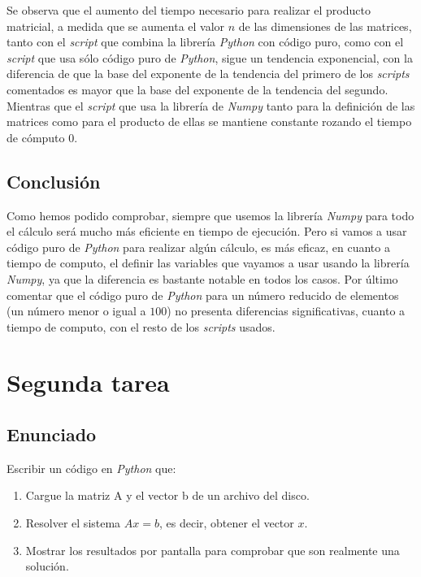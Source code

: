 \documentclass[12pt,twoside]{article}
\begin{document}
Se observa que el aumento del tiempo necesario para realizar el producto matricial, a medida que se aumenta el valor $n$ de las dimensiones de las matrices, tanto con el \textit{script} que combina la librería \textit{Python} con código puro, como con el \textit{script} que usa sólo código puro de \textit{Python}, sigue un tendencia exponencial, con la diferencia de que la base del exponente de la tendencia del primero de los \textit{scripts} comentados es mayor que la base del exponente de la tendencia del segundo. Mientras que el \textit{script} que usa la librería de \textit{Numpy} tanto para la definición de las matrices como para el producto de ellas se mantiene constante rozando el tiempo de cómputo 0.

\subsection{Conclusión}
Como hemos podido comprobar, siempre que usemos la librería \textit{Numpy} para todo el cálculo será mucho más eficiente en tiempo de ejecución. Pero si vamos a usar código puro de \textit{Python} para realizar algún cálculo, es más eficaz, en cuanto a tiempo de computo, el definir las variables que vayamos a usar usando la librería \textit{Numpy}, ya que la diferencia es bastante notable en todos los casos. Por último comentar que el código puro de \textit{Python} para un número reducido de elementos (un número menor o igual a $100$) no presenta diferencias significativas, cuanto a tiempo de computo, con el resto de los \textit{scripts} usados.

\section{Segunda tarea}

\subsection{Enunciado}

Escribir un código en \textit{Python} que:

\begin{enumerate}

\item Cargue la matriz A y el vector b de un archivo del disco.

\item Resolver el sistema $Ax=b$, es decir, obtener el vector $x$.

\item Mostrar los resultados por pantalla para comprobar que son realmente una solución.

\end{enumerate}
\end{document}
